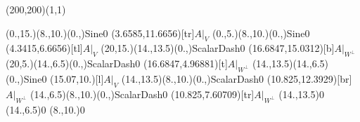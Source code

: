 \unitlength=1bp%

\begin{feynartspicture}(200,200)(1,1)

\FADiagram{}
\FAProp(0.,15.)(8.,10.)(0.,){Sine}{0}
\FALabel(3.6585,11.6656)[tr]{$A|_V$}
\FAProp(0.,5.)(8.,10.)(0.,){Sine}{0}
\FALabel(4.3415,6.6656)[tl]{$A|_V$}
\FAProp(20,15.)(14.,13.5)(0.,){ScalarDash}{0}
\FALabel(16.6847,15.0312)[b]{$A|_{W^\perp}$}
\FAProp(20,5.)(14.,6.5)(0.,){ScalarDash}{0}
\FALabel(16.6847,4.96881)[t]{$A|_{W^\perp}$}
\FAProp(14.,13.5)(14.,6.5)(0.,){Sine}{0}
\FALabel(15.07,10.)[l]{$A|_V$}
\FAProp(14.,13.5)(8.,10.)(0.,){ScalarDash}{0}
\FALabel(10.825,12.3929)[br]{$A|_{W^\perp}$}
\FAProp(14.,6.5)(8.,10.)(0.,){ScalarDash}{0}
\FALabel(10.825,7.60709)[tr]{$A|_{W^\perp}$}
\FAVert(14.,13.5){0}
\FAVert(14.,6.5){0}
\FAVert(8.,10.){0}
\end{feynartspicture}

